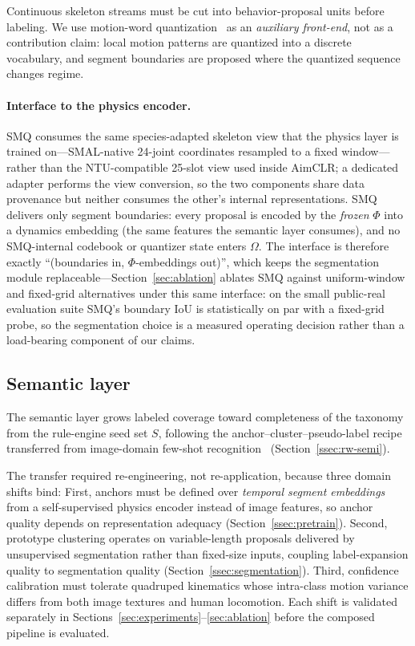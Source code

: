 Continuous skeleton streams must be cut into behavior-proposal units before labeling. We use motion-word quantization~\citep{gokay2025smq} as an \emph{auxiliary front-end}, not as a contribution claim: local motion patterns are quantized into a discrete vocabulary, and segment boundaries are proposed where the quantized sequence changes regime.

\paragraph{Interface to the physics encoder.}
SMQ consumes the same species-adapted skeleton view that the physics layer is trained on---SMAL-native 24-joint coordinates resampled to a fixed window---rather than the NTU-compatible 25-slot view used inside AimCLR; a dedicated adapter performs the view conversion, so the two components share data provenance but neither consumes the other's internal representations. SMQ delivers only segment boundaries: every proposal is encoded by the \emph{frozen} $\Phi$ into a dynamics embedding (the same features the semantic layer consumes), and no SMQ-internal codebook or quantizer state enters $\Omega$. The interface is therefore exactly ``(boundaries in, $\Phi$-embeddings out)'', which keeps the segmentation module replaceable---Section~\ref{sec:ablation} ablates SMQ against uniform-window and fixed-grid alternatives under this same interface: on the small public-real evaluation suite SMQ's boundary IoU is statistically on par with a fixed-grid probe, so the segmentation choice is a measured operating decision rather than a load-bearing component of our claims.

\subsection{Semantic layer}\label{ssec:semantic}

The semantic layer grows labeled coverage toward completeness of the taxonomy from the rule-engine seed set $S$, following the anchor--cluster--pseudo-label recipe transferred from image-domain few-shot recognition~\citep{snell2017prototypical} (Section~\ref{ssec:rw-semi}).

The transfer required re-engineering, not re-application, because three domain shifts bind: First, anchors must be defined over \emph{temporal segment embeddings} from a self-supervised physics encoder instead of image features, so anchor quality depends on representation adequacy (Section~\ref{ssec:pretrain}). Second, prototype clustering operates on variable-length proposals delivered by unsupervised segmentation rather than fixed-size inputs, coupling label-expansion quality to segmentation quality (Section~\ref{ssec:segmentation}). Third, confidence calibration must tolerate quadruped kinematics whose intra-class motion variance differs from both image textures and human locomotion. Each shift is validated separately in Sections~\ref{sec:experiments}--\ref{sec:ablation} before the composed pipeline is evaluated.

